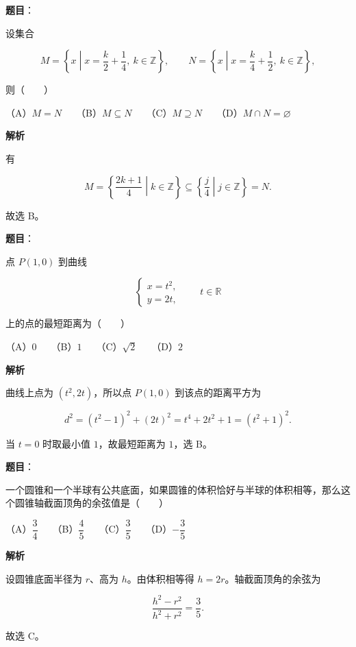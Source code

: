 \begin{answer}

\textbf{题目}：

设集合

\nopagebreak[4]
\[
M=\left\{x\middle|x=\frac{k}{2}+\frac14,\ k\in\mathbb Z\right\},\qquad
N=\left\{x\middle|x=\frac{k}{4}+\frac12,\ k\in\mathbb Z\right\},
\]

则\mbox{（　　）}

（A）$M=N$　　（B）$M\subseteq N$　　（C）$M\supseteq N$　　（D）$M\cap N=\varnothing$

\textbf{解析}

有

\nopagebreak[4]
\[
M=\left\{\frac{2k+1}{4}\middle|k\in\mathbb Z\right\}
\subseteq
\left\{\frac{j}{4}\middle|j\in\mathbb Z\right\}=N.
\]

故选 B。


\end{answer}
\begin{answer}

\textbf{题目}：

点 $P(1,0)$ 到曲线

\nopagebreak[4]
\[
\begin{cases}
x=t^2,\\
y=2t,
\end{cases}
\qquad t\in\mathbb R
\]

上的点的最短距离为\mbox{（　　）}

（A）$0$　　（B）$1$　　（C）$\sqrt2$　　（D）$2$

\textbf{解析}

曲线上点为 $(t^2,2t)$，所以点 $P(1,0)$ 到该点的距离平方为

\nopagebreak[4]
\[
d^2=(t^2-1)^2+(2t)^2
=t^4+2t^2+1
=(t^2+1)^2.
\]

当 $t=0$ 时取最小值 $1$，故最短距离为 $1$，选 B。


\end{answer}
\begin{answer}

\textbf{题目}：

一个圆锥和一个半球有公共底面，如果圆锥的体积恰好与半球的体积相等，那么这个圆锥轴截面顶角的余弦值是\mbox{（　　）}

（A）$\dfrac34$　　（B）$\dfrac45$　　（C）$\dfrac35$　　（D）$-\dfrac35$

\textbf{解析}

设圆锥底面半径为 $r$、高为 $h$。由体积相等得 $h=2r$。轴截面顶角的余弦为

\nopagebreak[4]
\[
\frac{h^2-r^2}{h^2+r^2}
=\frac35.
\]

故选 C。


\end{answer}
